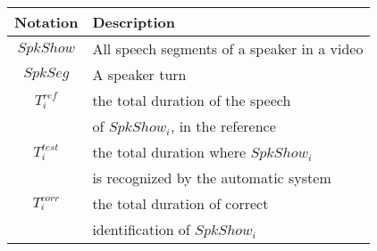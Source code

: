 \begin{tabular}{|c|l|}
\hline 
Notation & Description \\ 
\hline 
\hline
$SpkShow$ & All speech segments of a speaker in a video \\ 
$SpkSeg$  & A speaker turn \\
$T^{ref}_i$ & the total duration of the speech\\
& of  $SpkShow_i$, in the reference \\
$T^{test}_i$ & the total duration where $SpkShow_i$\\
& is recognized by the automatic system\\
$T^{corr}_i$ & the total duration of correct\\
& identification of $SpkShow_i$\\

\hline 
\end{tabular} 
